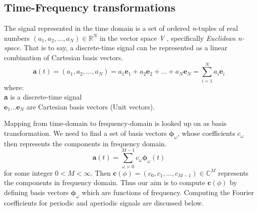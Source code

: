 \subsection{Time-Frequency transformations}
\label{time}
The signal represented in the time domain is a set of ordered \textit{n}-tuples of real numbers \( (a_{1},a_{2}, ...,a_{N}) \in \mathbb{R}^N \) in the vector space \textit{V} , specifically \textit{Euclidean n-space}. That is to say, a discrete-time signal can be represented as a \gls{linear combination} of Cartesian \gls{basis} vectors. 
\begin{equation}
\textbf{a}(t) = (a_{1},a_{2}, ...,a_{N}) = a_{1}\textbf{e}_{1} + a_{2}\textbf{e}_{2} + ... + a_{N}\textbf{e}_{N} = \displaystyle\sum_{i=1}^{N}a_{i}\textbf{e}_{i}
\end{equation} 
where:\\
\indent \textbf{a} is a discrete-time signal\\
\indent $\textbf{e}_{1} ... \textbf{e}_{N}$ are Cartesian basis vectors (Unit vectors).
\bigskip

\noindent Mapping from time-domain to frequency-domain is looked up on as \gls{basis transformation}. We need to find a set of basis vectors $\bm{\phi}_{ \omega }$, whose coefficients $c_{ \omega }$ then represents the components in frequency domain. 
\begin{equation}
\textbf{a}(t) = \displaystyle\sum_{ \omega =0}^{M-1}c_{ \omega }\bm{\phi}_{ \omega }(t) 
\end{equation}
for some integer $0 < M < \infty$. Then $\textbf{c}(\phi) = (c_{0},c_{1}, ...,c_{M-1}) \in \mathbb{C}^M $ represents the components in frequency domain. Thus our aim is to compute $\textbf{c}(\phi)$ by defining basis vectors $\bm{\phi}_{\omega}$ which are functions of frequency. Computing the Fourier coefficients for periodic and aperiodic signals are discussed below.

